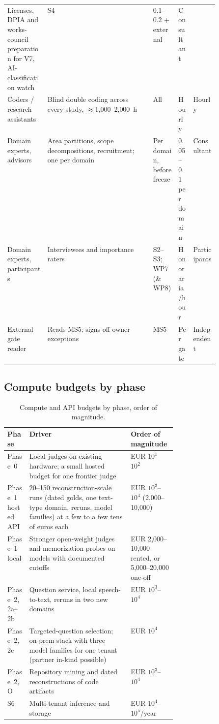 \begin{table}[htbp]
\begin{tabularx}{\linewidth}{@{}p{0.19\linewidth}Xp{0.12\linewidth}p{0.07\linewidth}p{0.12\linewidth}@{}}
      Licenses, DPIA and works-council preparation for V7, AI-classification watch &
      S4 & 0.1--0.2 + external & Consultant \\
    Coders / research assistants &
      Blind double coding across every study, $\approx$1{,}000--2{,}000~h &
      All & Hourly & Hourly \\
    Domain experts, advisors &
      Area partitions, scope decompositions, recruitment; one per domain &
      Per domain, before freeze & 0.05--0.1 per domain & Consultant \\
    Domain experts, participants &
      Interviewees and importance raters &
      S2--S3; WP7 (\& WP8) & Honoraria/hour & Participants \\
    External gate reader &
      Reads MS5; signs off owner exceptions &
      MS5 & Per gate & Independent \\
    \bottomrule
  \end{tabularx}
\end{table}

\subsection{Compute budgets by phase}

\begin{table}[htbp]
  \centering
  \footnotesize
  \caption{Compute and API budgets by phase, order of magnitude.}
  \label{tab:resources-compute}
  \begin{tabularx}{\linewidth}{@{}p{0.13\linewidth}Xp{0.27\linewidth}@{}}
    \toprule
    Phase & Driver & Order of magnitude \\
    \midrule
    Phase~0 &
      Local judges on existing hardware; a small hosted budget for one frontier judge &
      EUR $10^1$--$10^2$ \\
    Phase~1 hosted API &
      20--150 reconstruction-scale runs (dated golds, one text-type domain, reruns, model
      families) at a few to a few tens of euros each &
      EUR $10^3$--$10^4$ (2{,}000--10{,}000) \\
    Phase~1 local &
      Stronger open-weight judges and memorization probes on models with documented cutoffs &
      EUR 2{,}000--10{,}000 rented, or 5{,}000--20{,}000 one-off \\
    Phase~2, 2a--2b &
      Question service, local speech-to-text, reruns in two new domains & EUR $10^3$--$10^4$ \\
    Phase~2, 2c &
      Targeted-question selection; on-prem stack with three model families for one tenant
      (partner in-kind possible) & EUR $10^4$ \\
    Phase~2, O &
      Repository mining and dated reconstructions of code artifacts & EUR $10^3$--$10^4$ \\
    S6 &
      Multi-tenant inference and storage & EUR $10^4$--$10^5$/year \\
    \bottomrule
  \end{tabularx}
\end{table}

